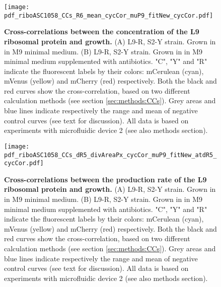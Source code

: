 
\begin{figure}
    \centering
    \texttt{[image: pdf\_riboASC1058\_CCs\_R6\_mean\_cycCor\_muP9\_fitNew\_cycCor.pdf]}
    \caption{ 
        \textbf{Cross-correlations between the concentration of the L9 ribosomal protein and growth.}
        (A) L9-R, S2-Y strain. Grown in in M9 minimal medium.
        (B) L9-R, S2-Y strain. Grown in in M9 minimal medium supplemented with antibiotics. 
        "C", "Y" and "R" indicate the fluorescent labels by their colors: mCerulean (cyan), mVenus (yellow) and mCherry (red) respectively.
        Both the black and red curves show the cross-correlation, based on two different calculation methods (see section \ref{sec:methods:CCs}).
        Grey areas and blue lines indicate respectively the range and mean of negative control curves (see text for discussion).
        All data is based on experiments with microfluidic device 2 (see also methods section).
%
    }
    \label{fig:ribo:CCsEmuL9}
\end{figure}

\begin{figure}
    \centering
    \texttt{[image: pdf\_riboASC1058\_CCs\_dR5\_divAreaPx\_cycCor\_muP9\_fitNew\_atdR5\_cycCor.pdf]}
    \caption{ 
        \textbf{Cross-correlations between the production rate of the L9 ribosomal protein and growth.}
        (A) L9-R, S2-Y strain. Grown in in M9 minimal medium.
        (B) L9-R, S2-Y strain. Grown in in M9 minimal medium supplemented with antibiotics. 
        "C", "Y" and "R" indicate the fluorescent labels by their colors: mCerulean (cyan), mVenus (yellow) and mCherry (red) respectively.
        Both the black and red curves show the cross-correlation, based on two different calculation methods (see section \ref{sec:methods:CCs}).
        Grey areas and blue lines indicate respectively the range and mean of negative control curves (see text for discussion).
        All data is based on experiments with microfluidic device 2 (see also methods section).
%
    }
    \label{fig:ribo:CCsPmuL9}
\end{figure}

